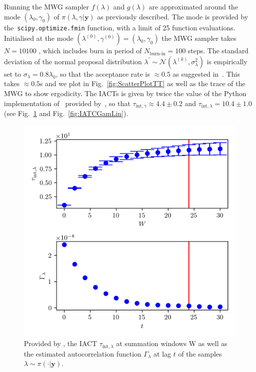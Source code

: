 Running the MWG sampler $f(\lambda)$ and $g(\lambda)$ are approximated around the mode $( \lambda_{0}, \gamma_0 )$ of $\pi(\lambda,\gamma| \bm{y})$ as previously described. 
The mode is provided by \linebreak the~\texttt{scipy.optimize.fmin} function, with a limit of 25 function evaluations.
Initialised at the mode $(\lambda^{(0)} , \gamma^{(0)}  ) = ( \lambda_{0} , \gamma_{0}  )$ the MWG sampler takes $N = 10100$ , which includes burn in period of $N_{\text{burn-in}} = 100$ steps.
The standard deviation of the normal proposal distribution $\lambda^{\prime} \sim \mathcal{N}(\lambda^{(k)} , \sigma^2_{\lambda})$ is empirically set to $\sigma_{\lambda} = 0.8 \lambda_0$, so that the acceptance rate is $\approx 0.5$ as suggested in~\cite{robertsLecNot}.
This takes  $\approx 0.5$s and we plot in Fig.~\ref{fig:ScatterPlotTT} as well as the trace of the MWG to show ergodicity.
The IACTs is given by twice the value of the Python implementation of~\cite{wolff2004monte} provided by~\cite{drikHesse}, so that $\tau_{\text{int}, \gamma} \approx 4.4 \pm 0.2$ and $\tau_{\text{int}, \lambda} = 10.4 \pm 1.0 $ (see Fig.~\ref{fig:IATCLamLin} and Fig.~\ref{fig:IATCGamLin}).
\begin{figure}[h!]
	\centering
	\includegraphics{UwerrTauIntFirstO3lam.png}
	\caption[IACT of $\lambda \sim \pi( \cdot| \bm{y})$, for linear model.]{Provided by \cite{drikHesse}, the IACT $\tau_{\text{int},\lambda}$ at summation windows W as well as the estimated autocorrelation function $\Gamma_{\lambda}$ at lag $t$ of the samples $\lambda \sim \pi( \cdot| \bm{y})$.}
	\label{fig:IATCLamLin}
\end{figure}


